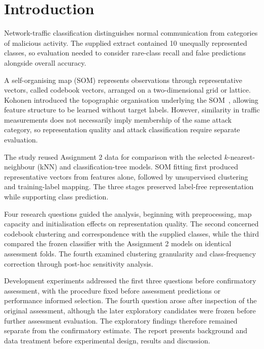 \section{Introduction}

Network-traffic classification distinguishes normal communication from categories of malicious activity. The supplied extract contained 10 unequally represented classes, so evaluation needed to consider rare-class recall and false predictions alongside overall accuracy.

A self-organising map (SOM) represents observations through representative vectors, called codebook vectors, arranged on a two-dimensional grid or lattice. Kohonen introduced the topographic organisation underlying the SOM~\cite{kohonen1982}, allowing feature structure to be learned without target labels. However, similarity in traffic measurements does not necessarily imply membership of the same attack category, so representation quality and attack classification require separate evaluation.

The study reused Assignment 2 data for comparison with the selected $k$-nearest-neighbour (kNN) and classification-tree models. SOM fitting first produced representative vectors from features alone, followed by unsupervised clustering and training-label mapping. The three stages preserved label-free representation while supporting class prediction.

Four research questions guided the analysis, beginning with preprocessing, map capacity and initialisation effects on representation quality. The second concerned codebook clustering and correspondence with the supplied classes, while the third compared the frozen classifier with the Assignment 2 models on identical assessment folds. The fourth examined clustering granularity and class-frequency correction through post-hoc sensitivity analysis.

Development experiments addressed the first three questions before confirmatory assessment, with the procedure fixed before assessment predictions or performance informed selection. The fourth question arose after inspection of the original assessment, although the later exploratory candidates were frozen before further assessment evaluation. The exploratory findings therefore remained separate from the confirmatory estimate. The report presents background and data treatment before experimental design, results and discussion.
